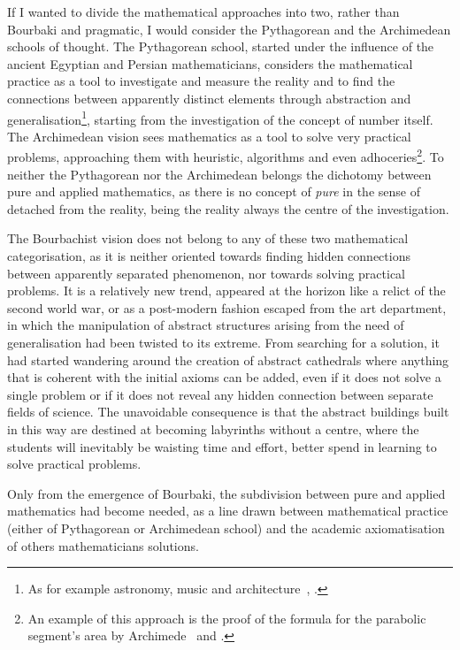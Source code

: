 \documentclass[]{scrartcl}
\theoremstyle{definition}
\begin{document}
If I wanted to divide the mathematical approaches into two, rather than Bourbaki and pragmatic, I would consider the Pythagorean and the Archimedean schools of thought. The Pythagorean school, started under the influence of the ancient Egyptian and Persian mathematicians, considers the mathematical practice as a tool to investigate and measure the reality and to find the connections between apparently distinct elements through abstraction and generalisation\footnote{
    As for example astronomy, music and architecture~\cite{robins1995mathematics}, \cite{boyer2011history}.
}, starting from the investigation of the concept of number itself. 
The Archimedean vision sees mathematics as a tool to solve very practical problems, approaching them with heuristic, algorithms and even adhoceries\footnote{
    An example of this approach is the proof of the formula for the parabolic segment's area by Archimede~\cite{boyer2011history} and \cite{strogatz2019infinite}.
}. To neither the Pythagorean nor the Archimedean belongs the dichotomy between pure and applied mathematics, as there is no concept of \emph{pure} in the sense of detached from the reality, being the reality always the centre of the investigation.

The Bourbachist vision does not belong to any of these two mathematical categorisation, as it is neither oriented towards finding hidden connections between apparently separated phenomenon, nor towards solving practical problems. It is a relatively new trend, appeared at the horizon like a relict of the second world war, or as a post-modern fashion escaped from the art department, in which the manipulation of abstract structures arising from the need of generalisation had been twisted to its extreme. From searching for a solution, it had started wandering around the creation of abstract cathedrals where anything that is coherent with the initial axioms can be added, even if it does not solve a single problem or if it does not reveal any hidden connection between separate fields of science. The unavoidable consequence is that the abstract buildings built in this way are destined at becoming labyrinths without a centre, where the students will inevitably be waisting time and effort, better spend in learning to solve practical problems.

Only from the emergence of Bourbaki, the subdivision between pure and applied mathematics had become needed, as a line drawn between mathematical practice (either of Pythagorean or Archimedean school) and the academic axiomatisation of others mathematicians solutions.
\end{document}
